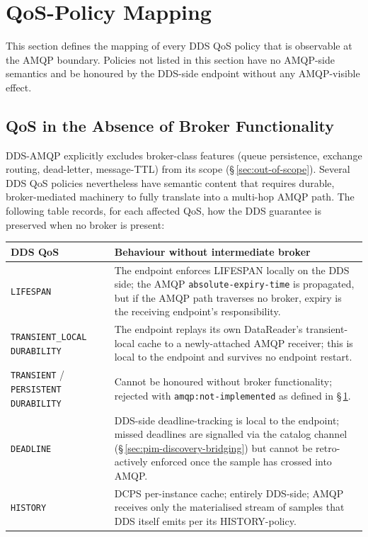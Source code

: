 \documentclass{../styles/zerodds-vendor-spec}
\begin{document}
\section{QoS-Policy Mapping}\label{sec:pim-settlement}

This section defines the mapping of every DDS QoS policy that is
observable at the AMQP boundary. Policies not listed in this
section have no AMQP-side semantics and  be honoured
by the DDS-side endpoint without any AMQP-visible effect.

\subsection{QoS in the Absence of Broker Functionality}

DDS-AMQP explicitly excludes broker-class features (queue
persistence, exchange routing, dead-letter, message-TTL) from its
scope (\S\,\ref{sec:out-of-scope}). Several DDS QoS policies
nevertheless have semantic content that requires durable,
broker-mediated machinery to fully translate into a multi-hop
AMQP path. The following table records, for each affected QoS,
how the DDS guarantee is preserved when no broker is present:

\begin{longtable}{p{3.5cm}p{8.5cm}}
  \toprule
  \textbf{DDS QoS} & \textbf{Behaviour without intermediate broker} \\
  \midrule
  \endhead
  \texttt{LIFESPAN}        & The endpoint enforces LIFESPAN locally on the DDS side; the AMQP \texttt{absolute-expiry-time} is propagated, but if the AMQP path traverses no broker, expiry is the receiving endpoint's responsibility. \\
  \texttt{TRANSIENT\_LOCAL DURABILITY} & The endpoint replays its own DataReader's transient-local cache to a newly-attached AMQP receiver; this is local to the endpoint and survives no endpoint restart. \\
  \texttt{TRANSIENT} / \texttt{PERSISTENT DURABILITY} & Cannot be honoured without broker functionality; rejected with \texttt{amqp:not-implemented} as defined in \S\,\ref{sec:pim-settlement}. \\
  \texttt{DEADLINE}        & DDS-side deadline-tracking is local to the endpoint; missed deadlines are signalled via the catalog channel (\S\,\ref{sec:pim-discovery-bridging}) but cannot be retro-actively enforced once the sample has crossed into AMQP. \\
  \texttt{HISTORY}         & DCPS per-instance cache; entirely DDS-side; AMQP receives only the materialised stream of samples that DDS itself emits per its HISTORY-policy. \\
  \bottomrule
\end{longtable}
\end{document}
